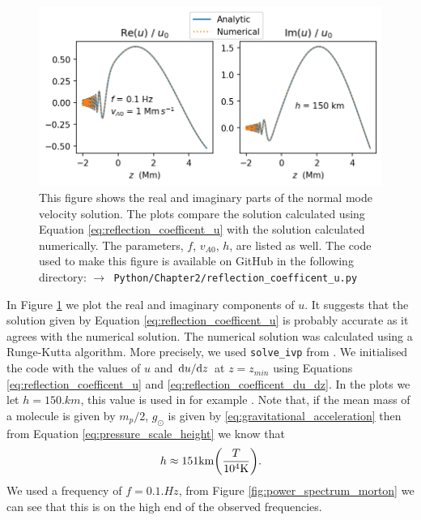 \begin{figure}
    \centering
    \vspace{-20pt}
    \includegraphics[width=\textwidth]{figures/chapter02/reflection_coefficent_u.png}
    \vspace{-20pt}
    \caption{This figure shows the real and imaginary parts of the normal mode velocity solution. The plots compare the solution calculated using Equation \eqref{eq:reflection_coefficent_u} with the solution calculated numerically. The parameters, $f$, $v_{A0}$, $h$, are listed as well. The code used to make this figure is available on GitHub in the following directory:\newline
    \texttt{$\rightarrow$ Python/Chapter2/reflection\_coefficent\_u.py}}
    \vspace{-10pt}
    \label{fig:reflection_coefficent_u}
\end{figure}

In Figure \ref{fig:reflection_coefficent_u} we plot the real and imaginary components of $u$. It suggests that the solution given by Equation \eqref{eq:reflection_coefficent_u} is probably accurate as it agrees with the numerical solution. The numerical solution was calculated using a Runge-Kutta algorithm. More precisely, we used \texttt{solve\_ivp} from \citet{SciPy2020}. We initialised the code with the values of $u$ and $\dv*{u}{z}$ at $z=z_{min}$ using Equations \eqref{eq:reflection_coefficent_u} and \eqref{eq:reflection_coefficent_du_dz}. In the plots we let $h=150\si{.km}$, this value is used in for example \citet{Hollweg1984b}. Note that, if the mean mass of a molecule is given by $m_p/2$, $g_\odot$ is given by \eqref{eq:gravitational_acceleration} then from Equation \eqref{eq:pressure_scale_height} we know that
\[h \approx 151\si{.km}\qty(\frac{T}{10^4\si{.K}}).\]
We used a frequency of $f=0.1\si{.Hz}$, from Figure \ref{fig:power_spectrum_morton} we can see that this is on the high end of the observed frequencies.

